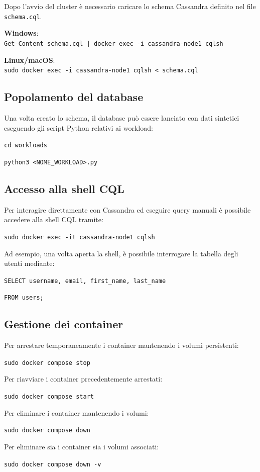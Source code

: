\documentclass[12pt]{article}
\begin{document}
Dopo l'avvio del cluster è necessario caricare lo schema Cassandra definito nel\newline
file \texttt{schema.cql}.

\textbf{Windows}:\\
\hspace*{1cm}\texttt{Get-Content schema.cql | docker exec -i cassandra-node1 cqlsh}

\textbf{Linux/macOS}:\\
\hspace*{1cm}\texttt{sudo docker exec -i cassandra-node1 cqlsh < schema.cql}

\subsection{Popolamento del database}

Una volta creato lo schema, il database può essere lanciato con dati sintetici eseguendo gli script Python relativi ai workload:

\texttt{cd workloads}

\texttt{python3 <NOME\_WORKLOAD>.py}

\subsection{Accesso alla shell CQL}

Per interagire direttamente con Cassandra ed eseguire query manuali è possibile accedere alla shell CQL tramite:

\texttt{sudo docker exec -it cassandra-node1 cqlsh}

\vspace{0.5cm}
\noindent
Ad esempio, una volta aperta la shell, è possibile interrogare la tabella degli utenti mediante:

\texttt{SELECT username, email, first\_name, last\_name}\newline

\texttt{FROM users;}

\subsection{Gestione dei container}

Per arrestare temporaneamente i container mantenendo i volumi persistenti:

\texttt{sudo docker compose stop}

\vspace{0.5cm}
\noindent
Per riavviare i container precedentemente arrestati:

\texttt{sudo docker compose start}

\vspace{0.5cm}
\noindent
Per eliminare i container mantenendo i volumi:

\texttt{sudo docker compose down}

\vspace{0.5cm}
\noindent
Per eliminare sia i container sia i volumi associati:

\texttt{sudo docker compose down -v}
\end{document}

